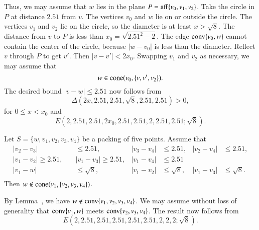 \begin{tarskidata}
\begin{tarski}
\begin{proved}
Thus, we may assume that $w$ lies in the plane $P={\operatorname{aff}}\{v_0,v_1,v_2\}$. Take the
circle in $P$ at distance $2.51$ from $v$. The vertices $v_0$ and $w$ lie
on or outside the circle. The vertices $v_1$ and $v_2$ lie on the
circle, so the diameter is at least $x>\sqrt{8}$.  The distance from
$v$ to $P$ is less than $x_0= \sqrt{2.51^2-2}$.  The edge 
${\operatorname{conv}}\{v_0,w\}$ cannot
contain the center of the circle, because $|w-v_0|$ is less than the
diameter.
%
Reflect $v$ through $P$ to get $v'$.  Then $|v-v'|< 2x_0$. Swapping
$v_1$ and $v_2$ as necessary, we may assume that 
  $$w\in{\operatorname{cone}}(v_0,\{v,v',v_2\}).$$  
The desired bound $|v-w|\le 2.51$ now follows from
  $$
  \Delta(2x,2.51,2.51,\sqrt8,2.51,2.51)>0,
  $$
for $0\le x< x_0$ and
  $$
  E(2,2.51,2.51,2x_0,2.51,2.51,2,2.51,2.51; \sqrt8).
  $$
\swallowed\end{proved}
\end{tarski}







\begin{tarski}

\begin{lemma}
Let $S=\{w,v_1,v_2,v_3,v_4\}$ be a packing of five points.
Assume that
  $$
  \begin{array}{rlrlrlrlrllll}
  |v_2-v_3|&\le 2.51,& |v_3-v_4|&\le 2.51,  &|v_2-v_4|&\le 2.51,\\
  |v_1-v_2|\ge 2.51,\quad &|v_1-v_3|\ge 2.51,&|v_1-v_4|&\le 2.51\\
  |v_1-w|&\le \sqrt8,&|v_1-v_2|&\le \sqrt8,&|v_1-v_3|&\le\sqrt8.\\
  \end{array}
$$
Then $w\not\in {\operatorname{cone}}(v_1,\{v_2,v_3,v_4\})$.
\end{lemma}

\begin{proved}
By Lemma~, we have $w\not\in{\operatorname{conv}}\{v_1,v_2,v_3,v_4\}$.
We may assume without loss of generality that
${\operatorname{conv}}\{v_1,w\}$ meets ${\operatorname{conv}}\{v_2,v_3,v_4\}$.  The result
now follows from
    $$
    E(2,2.51,2.51,2.51,2.51,2.51,2,2,2;  \sqrt{8}).
    $$
\swallowed\end{proved}
\end{tarski}








\end{tarskidata}
